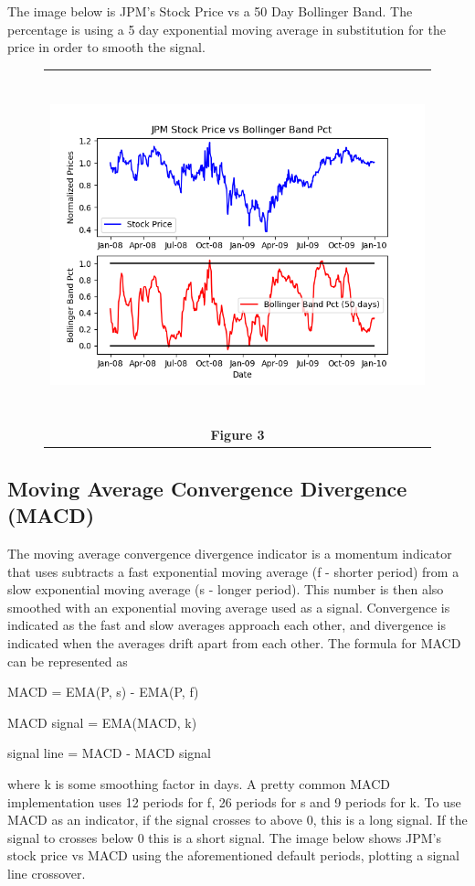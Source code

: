 \documentclass[
	letterpaper, %
]{jdf}
\begin{document}
The image below is JPM's Stock Price vs a 50 Day Bollinger Band.  The percentage is using a 5 day exponential moving average in substitution for the price in order to smooth the signal. 

\begin{figure}[h]
	\begin{tabular}{c}
		\includegraphics[height=10cm]{JPM_bollinger.png} \\
		\textbf{Figure 3} \\ 
	\end{tabular}
\end{figure}


\subsection{Moving Average Convergence Divergence (MACD)}

The moving average convergence divergence indicator is a momentum indicator that uses subtracts a fast exponential moving average (f - shorter period) from a slow exponential moving average (s - longer period).  This number is then also smoothed with an exponential moving average used as a signal. Convergence is indicated as the fast and slow averages approach each other, and divergence is indicated when the averages drift apart from each other. The formula for MACD can be represented as 

MACD = EMA(P, s) - EMA(P, f) 

MACD signal = EMA(MACD, k)

signal line = MACD - MACD signal

where k is some smoothing factor in days.  A pretty common MACD implementation uses 12 periods for f, 26 periods for s and 9 periods for k.  To use MACD as an indicator, if the signal crosses to above 0, this is a long signal.  If the signal to crosses below 0 this is a short signal. The image below shows JPM's stock price vs MACD using the aforementioned default periods, plotting a signal line crossover.
\end{document}
